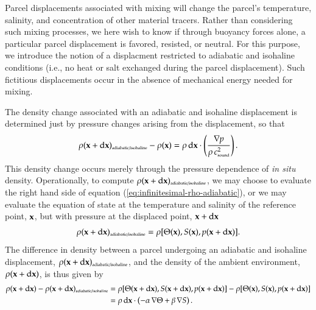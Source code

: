 Parcel displacements associated with mixing will change the parcel's
temperature, salinity, and concentration of other material
tracers. Rather than considering such mixing processes, we here wish
to know if through buoyancy forces alone, a particular parcel
displacement is favored, resisted, or neutral.  For this purpose, we
introduce the notion of a displacment restricted to adiabatic and
isohaline conditions (i.e., no heat or salt exchanged during the
parcel displacement).  Such fictitious displacements occur in the
absence of mechanical energy needed for mixing.

The density change associated with an adiabatic and isohaline
displacement is determined just by pressure changes arising from the
displacement, so that
\begin{equation}
\rho({\bf x} + \mathrm{d} {\bf x})_{\mbox{\tiny  adiabatic/isohaline}} - \rho({\bf x})  =
  \rho \, \mathrm{d}{\bf x} \cdot  \left( \frac{ \nabla p }{\rho \, c_{\mbox{\tiny sound}}^{2}  } \right).
\label{eq:infinitesimal-rho-adiabatic}
\end{equation}
This density change occurs merely through the pressure dependence of
{\it in situ} density.  Operationally, to compute $\rho({\bf x} +
\mathrm{d} {\bf x})_{\mbox{\tiny adiabatic/isohaline}}$, we may choose
to evaluate the right hand side of equation
(\ref{eq:infinitesimal-rho-adiabatic}), or we may evaluate the
equation of state at the temperature and salinity of the reference
point, ${\bf x}$, but with pressure at the displaced point, ${\bf x} +
\mathrm{d} {\bf x}$
\begin{equation}
  \rho({\bf x} + \mathrm{d} {\bf x})_{\mbox{\tiny adiabatic/isohaline}} 
 = \rho[ \Theta({\bf x}), S({\bf x}), p({\bf x}  + \mathrm{d} {\bf x})]. 
\end{equation}
The difference in density between a parcel undergoing an adiabatic and
isohaline displacement, $\rho({\bf x} + \mathrm{d} {\bf x})_{\mbox{\tiny
    adiabatic/isohaline}}$, and the density of the ambient environment,
$\rho({\bf x} + \mathrm{d} {\bf x})$, is thus given by
\begin{equation}
\begin{split}
\rho({\bf x} + \mathrm{d} {\bf x})  - \rho({\bf x} + \mathrm{d} {\bf x})_{\mbox{\tiny  adiabatic/isohaline}} 
&=
\rho[ \Theta({\bf x} + \mathrm{d} {\bf x}), S({\bf x} + \mathrm{d} {\bf x}), p({\bf x} + \mathrm{d} {\bf x})]
-
\rho[ \Theta({\bf x} ), S({\bf x}), p({\bf x} + \mathrm{d} {\bf x})]
\\
&= 
  \rho \, \mathrm{d}{\bf x} \cdot 
  \left( -\alpha \, \nabla \Theta + \beta \, \nabla  S \right).
\end{split}
\label{eq:neutral-directions-motivated}
\end{equation}
